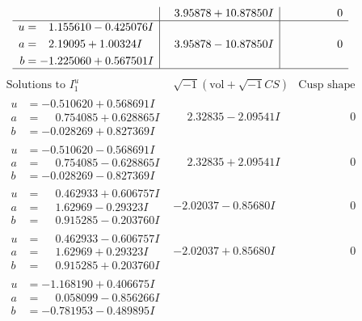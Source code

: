 \documentclass[1p]{elsarticle_modified}
\theoremstyle{definition}
\newcommand{\I}{\sqrt{-1}}
\begin{document}
$$\begin{array}{c|c|c}
 & \phantom{-}3.95878 + 10.87850 I & \phantom{-0.000000 } 0 \\ \hline\begin{aligned}
u &= \phantom{-}1.155610 - 0.425076 I \\
a &= \phantom{-}2.19095 + 1.00324 I \\
b &= -1.225060 + 0.567501 I\end{aligned}
 & \phantom{-}3.95878 - 10.87850 I & \phantom{-0.000000 } 0\\
 \hline 
 \end{array}$$\newpage$$\begin{array}{c|c|c}  
\text{Solutions to }I^u_{1}& \I (\text{vol} + \sqrt{-1}CS) & \text{Cusp shape}\\
 \hline 
\begin{aligned}
u &= -0.510620 + 0.568691 I \\
a &= \phantom{-}0.754085 + 0.628865 I \\
b &= -0.028269 + 0.827369 I\end{aligned}
 & \phantom{-}2.32835 - 2.09541 I & \phantom{-0.000000 } 0 \\ \hline\begin{aligned}
u &= -0.510620 - 0.568691 I \\
a &= \phantom{-}0.754085 - 0.628865 I \\
b &= -0.028269 - 0.827369 I\end{aligned}
 & \phantom{-}2.32835 + 2.09541 I & \phantom{-0.000000 } 0 \\ \hline\begin{aligned}
u &= \phantom{-}0.462933 + 0.606757 I \\
a &= \phantom{-}1.62969 - 0.29323 I \\
b &= \phantom{-}0.915285 - 0.203760 I\end{aligned}
 & -2.02037 - 0.85680 I & \phantom{-0.000000 } 0 \\ \hline\begin{aligned}
u &= \phantom{-}0.462933 - 0.606757 I \\
a &= \phantom{-}1.62969 + 0.29323 I \\
b &= \phantom{-}0.915285 + 0.203760 I\end{aligned}
 & -2.02037 + 0.85680 I & \phantom{-0.000000 } 0 \\ \hline\begin{aligned}
u &= -1.168190 + 0.406675 I \\
a &= \phantom{-}0.058099 - 0.856266 I \\
b &= -0.781953 - 0.489895 I\end{aligned}

\end{array}$$
\end{document}
